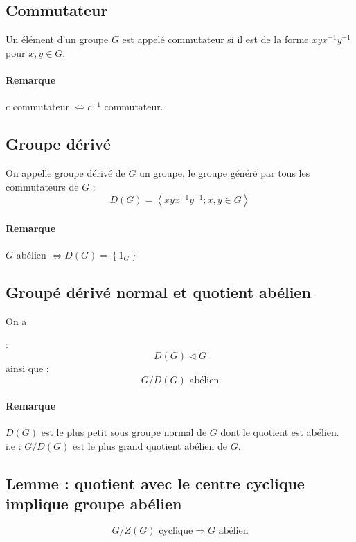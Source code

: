 \documentclass[a4paper,10pt]{report}
\newcommand{\grp}[1]{\left\langle #1 \right\rangle} %
\newcommand{\set}[1]{\left\lbrace #1 \right\rbrace } %
\newcommand{\so}{\Rightarrow}
\newcommand{\mfootnote}[1]{\up{(}\footnote{#1}\up{)}}
\begin{document}
   \subsection{Commutateur}
    Un élément d'un groupe $G$ est appelé commutateur si il est de la forme
    $xyx^{-1}y^{-1}$ pour $x,y \in G$.

    \paragraph{Remarque} $c$ commutateur $\iff c^{-1}$ commutateur.

   \subsection{Groupe dérivé}
    On appelle groupe dérivé de $G$ un groupe, le groupe généré
    par tous les commutateurs de $G$ :
    $$D(G)=\grp{xyx^{-1}y^{-1}; x,y \in G}$$

    \paragraph{Remarque} $G$ abélien $\iff D(G)=\set{1_G}$ 

   \subsection{Groupé dérivé normal et quotient abélien}
    On a
    \begin{comment}
      \mfootnote{Preuve : 15/10/08 p2 verso} 
    \end{comment}
    : $$D(G) \triangleleft G$$
    ainsi que : $$G/D(G) \text{ abélien}$$

    \paragraph{Remarque} $D(G)$ est le plus petit sous groupe normal de $G$ dont
    le quotient est abélien.\\
    i.e : $G/D(G)$ est le plus grand quotient abélien de $G$.

   \subsection{Lemme : quotient avec le centre cyclique implique groupe abélien}
    $$G/Z(G) \text{ cyclique} \so G \text{ abélien}$$
    \begin{comment}
      \mfootnote{Preuve : CM 15/10/08 p2 verso}
    \end{comment}
\end{document}
